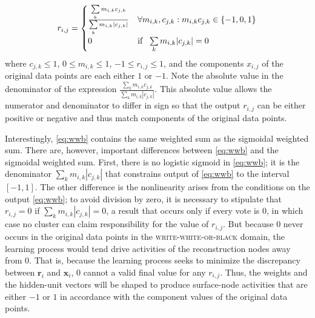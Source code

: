  \begin{align}\label{eq:wwb}
  r_{i,j} &=
    \begin{cases}
      \frac{\sum\limits_{k} m_{i,k} c_{j,k}}{\sum\limits_{k} m_{i,k} |c_{j,k}|} & \text{$\forall m_{i,k}, c_{j,k} : m_{i,k} c_{j,k} \in \{-1,0,1\} $}\\
      0 & \text{if \, $\sum\limits_{k} m_{i,k} |c_{j,k}|= 0$}\\
    \end{cases} \\
 \end{align}
where $c_{j,k} \leq 1$, $0 \leq  m_{i,k} \leq  1$,  $-1 \leq  r_{i,j} \leq  1$, 
and the components $x_{i,j}$ of the original data points
are each either $1$ or  $-1$. Note the absolute value in the denominator 
of the expression $\frac{\sum_{k} m_{i,k} c_{j,k}}{\sum_{k} m_{i,k} |c_{j,k}|}$. 
This absolute value allows the numerator and denominator to differ in sign so that 
the output $r_{i,j}$ can be either positive or negative and thus match components of the original data points.

 Interestingly, \eqref{eq:wwb} contains the same weighted sum 
 as the sigmoidal weighted sum. There are, however, important differences 
 between \eqref{eq:wwb} and the sigmoidal weighted sum. First, there is 
 no logistic sigmoid in \eqref{eq:wwb}; it is the denominator $\sum_{k} m_{i,k} |c_{j,k}|$ 
 that constrains output of \eqref{eq:wwb} to the interval $[-1,1]$. The other 
 difference is the nonlinearity arises from the conditions on the output \eqref{eq:wwb}; 
 to avoid division by zero, it is necessary to stipulate that $r_{i,j}=0$ if 
 $\sum_{k} m_{i,k} |c_{j,k}| = 0$, a result that occurs only if every vote is 0, 
 in which case no cluster can claim responsibility for the value of $r_{i,j}$. But 
 because $0$ never occurs in the original data points in the \textsc{write-white-or-black} 
 domain, the learning process would tend drive activities of the reconstruction nodes 
 away from $0$. That is, because the learning process seeks to minimize the discrepancy 
 between $\textbf{r}_i$ and $\textbf{x}_i$, $0$ cannot a valid final value for any $r_{i,j}$.  
 Thus, the weights and the hidden-unit vectors will be shaped to produce surface-node 
 activities that are either $-1$ or $1$ in accordance with the component values of 
 the original data points. 

